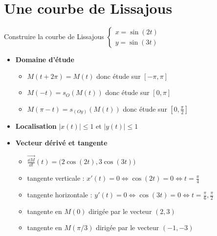 \section{Une courbe de Lissajous}

\begin{frame}
\begin{exemple}
Construire la courbe de Lissajous $\left\{
\begin{array}{l}
x=\sin(2t)\\
y=\sin(3t)
\end{array}
\right.$ 
\pause

\begin{itemize}
  \item \textbf{Domaine d'étude}
  \pause
  \begin{itemize}
    \item $M(t+2\pi)=M(t)$ donc étude sur $[-\pi,\pi]$
    \pause
    \item $M(-t)=s_O(M(t))$ donc étude sur $[0,\pi]$
    \pause
    \item $M(\pi-t)=s_{(Oy)}(M(t))$ donc étude sur $[0,\frac\pi2]$
  \end{itemize}

\pause
 \medskip
  \item \textbf{Localisation} \pause $|x(t)|\leq1$ et $|y(t)|\leq1$ 

\pause
  \medskip
  \item \textbf{Vecteur dérivé et tangente} 
  \pause
  \begin{itemize}
    \item $\overrightarrow{\frac{\dd M}{\dd t}}(t)=\big(2\cos(2t),3\cos(3t)\big)$
    \pause
    \item tangente verticale : $x'(t) = 0 \iff \cos(2t)=0 \iff t = \tfrac{\pi}{4}$
    \pause
    \item tangente horizontale : $y'(t) = 0 \iff \cos(3t)=0 \iff t = \tfrac{\pi}{6},\tfrac{\pi}{2}$
    \pause
    \item tangente en $M(0)$  dirigée par le vecteur $(2,3)$ 
    \pause
    \item tangente en $M(\pi/3)$ dirigée par le vecteur $(-1,-3)$
  \end{itemize}
\end{itemize}
\end{exemple}

\end{frame}


